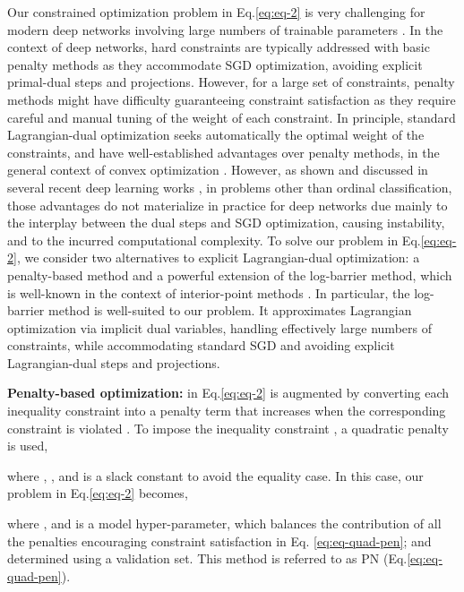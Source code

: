 \documentclass[8pt]{article}
\theoremstyle{definition}
\begin{document}
Our constrained optimization problem in Eq.\eqref{eq:eq-2} is very challenging for modern deep networks involving large numbers of trainable parameters \citep{kervadec2019constrained,kervadec2019log,marquez2017imposing,pathak2015constrained,ravi2018constrained}. In the context of deep networks, hard constraints are typically addressed with basic penalty methods \citep{he2016learning,jia2017constrained,kervadec2019constrained}  as they accommodate SGD optimization, avoiding explicit primal-dual steps and projections. However, for a large set of constraints, penalty methods might have difficulty guaranteeing
constraint satisfaction as they require careful and manual tuning of the weight of each constraint. In principle, standard Lagrangian-dual optimization seeks automatically the optimal weight of the constraints, and have well-established advantages over penalty methods, in the general context of convex optimization \citep{boyd2004convex}. However, as shown and discussed in several recent deep learning works \citep{marquez2017imposing,pathak2015constrained,ravi2018constrained,kervadec2019constrained,kervadec2019log}, in problems other than ordinal classification, those advantages do not materialize in practice for deep networks due mainly to the interplay between the dual steps and SGD optimization, causing instability, and to the incurred computational complexity. To solve our problem in Eq.\eqref{eq:eq-2}, we consider two alternatives to explicit Lagrangian-dual optimization: a penalty-based method and a powerful extension of the log-barrier method, which is well-known in the context of interior-point methods \citep{boyd2004convex,kervadec2019log}. In particular, the log-barrier method is well-suited to our problem. It approximates Lagrangian optimization via implicit dual variables, handling effectively large numbers of constraints, while accommodating standard SGD and avoiding explicit Lagrangian-dual steps and projections.

\textbf{Penalty-based optimization:}  in Eq.\ref{eq:eq-2} is augmented by converting each inequality constraint into a penalty term  that increases when the corresponding constraint is violated \citep{bertsekas1995athena}. To impose the inequality constraint , a quadratic penalty is used,

where , , and  is a slack constant to avoid the equality case. In this case, our problem in Eq.\eqref{eq:eq-2} becomes,

where , and  is a model hyper-parameter, which balances the contribution of all the penalties encouraging constraint satisfaction in Eq. \eqref{eq:eq-quad-pen}; and determined using a validation set. This method is referred to as PN (Eq.\ref{eq:eq-quad-pen}).
\end{document}
